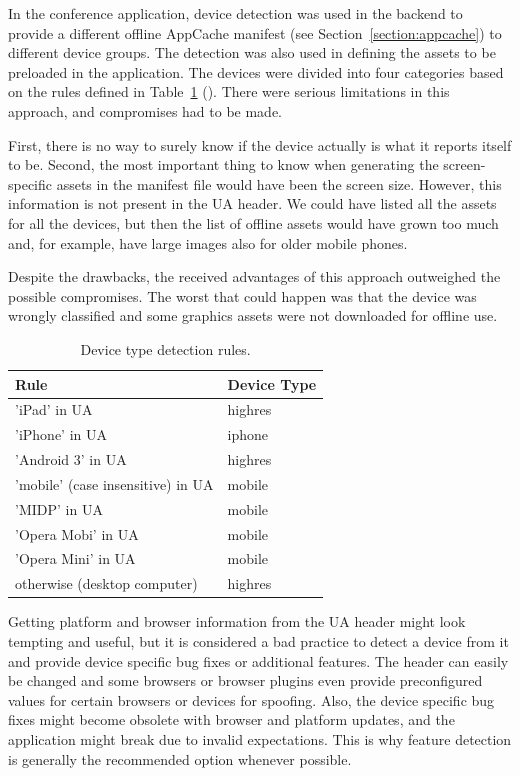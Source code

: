 In the conference application, device detection was used in the
backend to provide a different offline AppCache manifest (see
Section~\ref{section:appcache}) to different device groups. The
detection was also used in defining the assets to be preloaded in the
application. The devices were divided into four categories based on
the rules defined in Table~\ref{table:device-detection-rules}
(). There were serious limitations in
this approach, and compromises had to be made.

First, there is no way to surely know if the device actually is what
it reports itself to be. Second, the most important thing to know when
generating the screen-specific assets in the manifest file would have
been the screen size. However, this information is not present in the
UA header. We could have listed all the assets for all the devices,
but then the list of offline assets would have grown too much and, for
example, have large images also for older mobile phones.

Despite the drawbacks, the received advantages of this approach
outweighed the possible compromises. The worst that could happen was
that the device was wrongly classified and some graphics assets were
not downloaded for offline use.

\begin{table}
  \begin{tabular}{ l | l }
    \textbf{Rule} & \textbf{Device Type} \\ \hline
    'iPad' in UA & highres \\
    'iPhone' in UA & iphone \\
    'Android 3' in UA & highres \\
    'mobile' (case insensitive) in UA & mobile \\
    'MIDP' in UA & mobile \\
    'Opera Mobi' in UA & mobile \\
    'Opera Mini' in UA & mobile \\
    otherwise (desktop computer) & highres
  \end{tabular}
  \label{table:device-detection-rules}
  \caption{Device type detection rules.}
\end{table}

Getting platform and browser information from the UA header might look
tempting and useful, but it is considered a bad practice to detect a
device from it and provide device specific bug fixes or additional
features. The header can easily be changed and some browsers or
browser plugins even provide preconfigured values for certain browsers
or devices for spoofing. Also, the device specific bug fixes might
become obsolete with browser and platform updates, and the application
might break due to invalid expectations. This is why feature detection
is generally the recommended option whenever possible.

